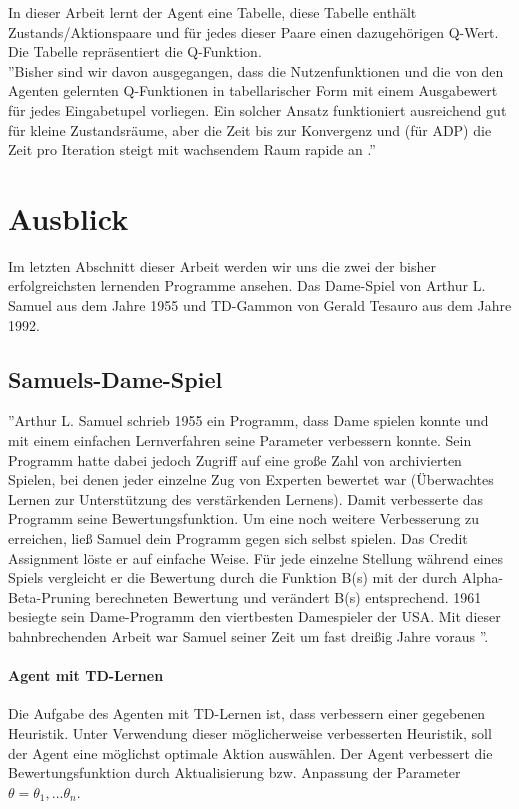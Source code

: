 In dieser Arbeit lernt der Agent eine Tabelle, diese Tabelle enthält Zustands/Aktionspaare und für jedes dieser Paare einen dazugehörigen Q-Wert. Die Tabelle repräsentiert die Q-Funktion. \\

''Bisher sind wir davon ausgegangen, dass die Nutzenfunktionen und die von den Agenten gelernten Q-Funktionen in tabellarischer Form mit einem Ausgabewert für jedes Eingabetupel vorliegen. Ein solcher Ansatz funktioniert ausreichend gut für kleine Zustandsräume, aber die Zeit bis zur Konvergenz und (für ADP) die Zeit pro Iteration steigt mit wachsendem Raum rapide an \cite[975]{Russell}.''   


\section{Ausblick}
\label{sec:Ausblick}
Im letzten Abschnitt dieser Arbeit werden wir uns die zwei der bisher erfolgreichsten lernenden Programme ansehen. Das Dame-Spiel von Arthur L. Samuel aus dem Jahre 1955 und TD-Gammon von Gerald Tesauro aus dem Jahre 1992. 

\subsection{Samuels-Dame-Spiel}
''Arthur L. Samuel schrieb 1955 ein Programm, dass Dame spielen konnte und mit einem einfachen Lernverfahren seine Parameter verbessern konnte. Sein Programm hatte dabei jedoch Zugriff auf eine große Zahl von archivierten Spielen, bei denen jeder einzelne Zug von Experten bewertet war (Überwachtes Lernen zur Unterstützung des verstärkenden Lernens). Damit verbesserte das Programm seine Bewertungsfunktion. Um eine noch weitere Verbesserung zu erreichen, ließ Samuel dein Programm gegen sich selbst spielen. Das Credit Assignment löste er auf einfache Weise. Für jede einzelne Stellung während eines Spiels vergleicht er die Bewertung durch die Funktion B(s) mit der durch Alpha-Beta-Pruning berechneten Bewertung und verändert B(s) entsprechend. 1961 besiegte sein Dame-Programm den viertbesten Damespieler der USA. Mit dieser bahnbrechenden Arbeit war Samuel seiner Zeit um fast dreißig Jahre voraus \cite[120\psq]{Ertel}''.

\paragraph{Agent mit TD-Lernen}
Die Aufgabe des Agenten mit TD-Lernen ist, dass verbessern einer gegebenen Heuristik. Unter Verwendung dieser möglicherweise verbesserten Heuristik, soll der Agent eine möglichst optimale Aktion auswählen. Der Agent verbessert die Bewertungsfunktion durch Aktualisierung bzw. Anpassung der Parameter $\theta = \theta_1, ... \theta_n$. 

